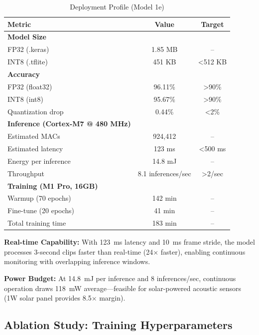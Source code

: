 \documentclass[10pt,a4paper,twoside]{article}
\begin{document}
\begin{table}[h]
	\centering
	\caption{Deployment Profile (Model 1e)}
	\label{tab:deployment}
	\begin{tabular}{lcc}
		\toprule
		\textbf{Metric} & \textbf{Value} & \textbf{Target} \\
		\midrule
		\textbf{Model Size} & & \\
		\quad FP32 (.keras) & 1.85 MB & -- \\
		\quad INT8 (.tflite) & 451 KB & <512 KB \\
		\midrule
		\textbf{Accuracy} & & \\
		\quad FP32 (float32) & 96.11\% & >90\% \\
		\quad INT8 (int8) & 95.67\% & >90\% \\
		\quad Quantization drop & 0.44\% & <2\% \\
		\midrule
		\textbf{Inference (Cortex-M7 @ 480 MHz)} & & \\
		\quad Estimated MACs & 924,412 & -- \\
		\quad Estimated latency & 123 ms & <500 ms \\
		\quad Energy per inference & 14.8 mJ & -- \\
		\quad Throughput & 8.1 inferences/sec & >2/sec \\
		\midrule
		\textbf{Training (M1 Pro, 16GB)} & & \\
		\quad Warmup (70 epochs) & 142 min & -- \\
		\quad Fine-tune (20 epochs) & 41 min & -- \\
		\quad Total training time & 183 min & -- \\
		\bottomrule
	\end{tabular}
\end{table}

\noindent\textbf{Real-time Capability:} With 123~ms latency and 10~ms frame stride, the model processes 3-second clips faster than real-time (24$\times$ faster), enabling continuous monitoring with overlapping inference windows.

\noindent\textbf{Power Budget:} At 14.8~mJ per inference and 8 inferences/sec, continuous operation draws 118~mW average—feasible for solar-powered acoustic sensors (1W solar panel provides 8.5$\times$ margin).

\subsection{Ablation Study: Training Hyperparameters}
\label{sec:ablation_training}
\end{document}
